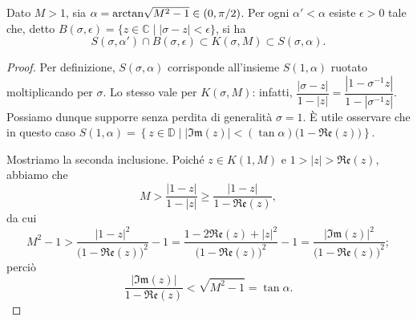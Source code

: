 \begin{prop} \label{settori-stolz}
  Dato $M>1$, sia $\alpha=\text{\normalfont{arctan}}\sqrt{M^2-1} \in (0,\pi/2)$. Per ogni $\alpha'<\alpha$ esiste $\epsilon>0$ tale che, detto $B(\sigma,\epsilon)=\{z \in \mathbb{C} \mid |\sigma-z|<\epsilon\}$, si ha
  $$S(\sigma,\alpha')\cap B(\sigma,\epsilon) \subset K(\sigma,M) \subset S(\sigma,\alpha).$$
\end{prop}

\begin{proof}
  Per definizione, $S(\sigma,\alpha)$ corrisponde all'insieme $S(1,\alpha)$ ruotato moltiplicando per $\sigma$. Lo stesso vale per $K(\sigma,M)$: infatti, $\dfrac{|\sigma-z|}{1-|z|}=\dfrac{|1-\sigma^{-1}z|}{1-|\sigma^{-1}z|}$. Possiamo dunque supporre senza perdita di generalità $\sigma=1$. È utile osservare che in questo caso $S(1,\alpha)=\left\{z \in \mathbb{D} \mid |\mathfrak{Im}(z)|<(\tan{\alpha})\bigl(1-\mathfrak{Re}(z)\bigr)\right\}$.

  Mostriamo la seconda inclusione. Poiché $z \in K(1,M)$ e $1>|z|>\mathfrak{Re}(z)$, abbiamo che
  $$M>\frac{|1-z|}{1-|z|}\ge \frac{|1-z|}{1-\mathfrak{Re}(z)},$$
  da cui
  $$M^2-1 > \frac{|1-z|^2}{\bigl(1-\mathfrak{Re}(z)\bigr)^2}-1=\frac{1-2\mathfrak{Re}(z)+|z|^2}{\bigl(1-\mathfrak{Re}(z)\bigr)^2}-1=\frac{|\mathfrak{Im}(z)|^2}{\bigl(1-\mathfrak{Re}(z)\bigr)^2};$$
  perciò
  $$\frac{|\mathfrak{Im}(z)|}{1-\mathfrak{Re}(z)}<\sqrt{M^2-1}=\tan{\alpha}.$$


\end{proof}
